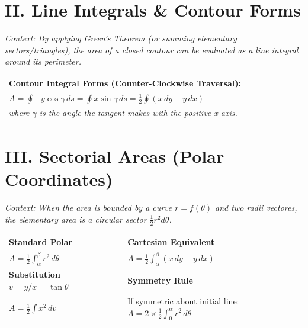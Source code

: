 \documentclass[11pt, a4paper]{article}
\begin{document}
\vspace{0.3cm}

\section*{\color{primary} II. Line Integrals \& Contour Forms}

\textit{\small Context: By applying Green's Theorem (or summing elementary sectors/triangles), the area of a closed contour can be evaluated as a line integral around its perimeter.}

\begin{center}
\begin{tabular}{@{}p{}@{}}
\toprule
\textbf{\color{accent}Contour Integral Forms (Counter-Clockwise Traversal):} \\
$A = \oint -y \cos \gamma \, ds = \oint x \sin \gamma \, ds = \frac{1}{2} \oint (x \, dy - y \, dx)$ \\
\textit{\small where $\gamma$ is the angle the tangent makes with the positive x-axis.} \\
\bottomrule
\end{tabular}
\end{center}

\vspace{0.3cm}

\section*{\color{primary} III. Sectorial Areas (Polar Coordinates)}

\textit{\small Context: When the area is bounded by a curve $r=f(\theta)$ and two radii vectores, the elementary area is a circular sector $\frac{1}{2}r^2 d\theta$.}

\begin{center}
\begin{tabular}{@{}p{} p{}@{}}
\toprule
\textbf{Standard Polar} & \textbf{Cartesian Equivalent} \\
\midrule
$A = \frac{1}{2} \int_{\alpha}^{\beta} r^2 \, d\theta$ & $A = \frac{1}{2} \int_{\alpha}^{\beta} (x \, dy - y \, dx)$ \\
\midrule
\textbf{Substitution $v = y/x = \tan \theta$} & \textbf{Symmetry Rule} \\
\midrule
$A = \frac{1}{2} \int x^2 \, dv$ & If symmetric about initial line: $A = 2 \times \frac{1}{2} \int_0^{\alpha} r^2 \, d\theta$ \\
\bottomrule
\end{tabular}
\end{center}
\end{document}
